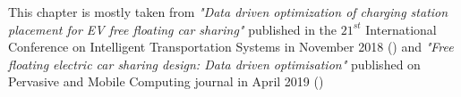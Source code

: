 %
%
%

This chapter is mostly taken from \textit{"Data driven optimization of charging station placement for EV free floating car sharing"} published in the $21^{st}$ International Conference on Intelligent Transportation Systems in November 2018 (\cite{maui}) and \textit{"Free floating electric car sharing design: Data driven optimisation"} published on Pervasive and Mobile Computing journal in April 2019 (\cite{coccaopt})
  